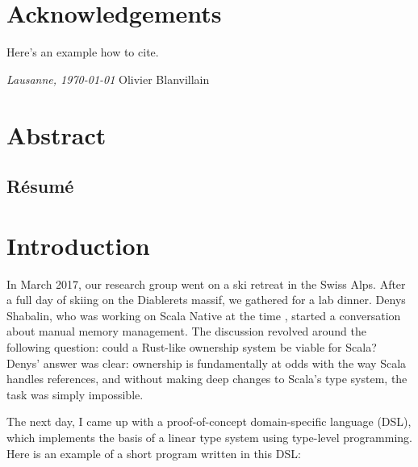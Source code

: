 



\frontmatter

\setcounter{page}{0}

\chapter{Acknowledgements}
\lipsum[1-2]
Here's an example how to cite.

\bigskip
\noindent\textit{Lausanne, \today}
\hfill Olivier Blanvillain

\cleardoublepage
\chapter*{Abstract}
\lipsum[1-2] %
\begin{otherlanguage}{french}
\cleardoublepage
\chapter*{Résumé}
\lipsum[1-2]
\end{otherlanguage}

\tableofcontents

\cleardoublepage
{}
{}
\listoffigures
\mainmatter


\chapter{Introduction}
\label{chap:introduction}

In March 2017, our research group went on a ski retreat in the Swiss Alps.
After a full day of skiing on the Diablerets massif, we gathered for a lab dinner.
Denys Shabalin, who was working on Scala Native at the time \citep{shabalin2020just}, started a conversation about manual memory management.
The discussion revolved around the following question: could a Rust-like ownership system be viable for Scala?
Denys' answer was clear: ownership is fundamentally at odds with the way Scala handles references, and without making deep changes to Scala's type system, the task was simply impossible.

The next day, I came up with a proof-of-concept domain-specific language (DSL), which implements the basis of a linear type system using type-level programming.
Here is an example of a short program written in this DSL:

